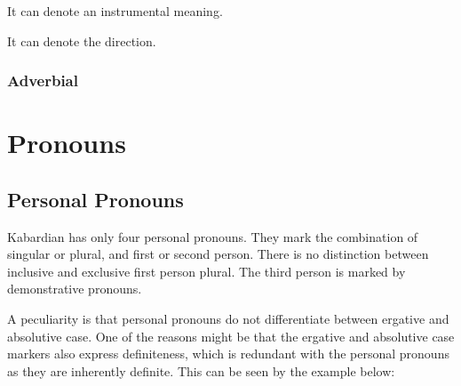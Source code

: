 \documentclass[a4paper, 10pt]{book}
\begin{document}
It can denote an instrumental meaning.
\begin{exe}
\ex
\begin{xlist}
    \ex {}
    \ex {}
\end{xlist}
\end{exe}


It can denote the direction.

\begin{exe}
\ex
\begin{xlist}
    \ex {}
\end{xlist}
\end{exe}

\subsection{Adverbial}



\chapter{Pronouns}
\section{Personal Pronouns}
Kabardian has only four personal pronouns. They mark the combination of singular or plural, and first or second person. There is no distinction between inclusive and exclusive first person plural. The third person is marked by demonstrative pronouns.

A peculiarity is that personal pronouns do not differentiate between ergative and absolutive case. One of the reasons might be that the ergative and absolutive case markers also express definiteness, which is redundant with the personal pronouns as they are inherently definite. This can be seen by the example below:
\begin{exe}
\ex
\begin{xlist}
    \ex {}
    \ex {}
    \ex {}
    \ex {}
\end{xlist}
\end{exe}
\end{document}
